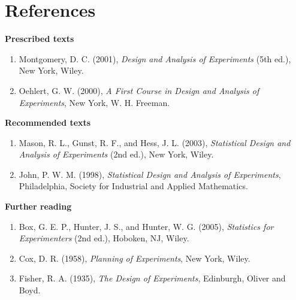 \documentclass[11pt,a4paper]{article}
\numberwithin{equation}{section}
\theoremstyle{definition}
\newcommand{\subhead}[1]{%
  \par\medskip\noindent\textbf{#1}\par\nobreak\smallskip}
\begin{document}
\section*{References}

\subhead{Prescribed texts}
\begin{enumerate}
\item Montgomery, D. C. (2001), \emph{Design and Analysis of Experiments} (5th ed.), New York, Wiley.
\item Oehlert, G. W. (2000), \emph{A First Course in Design and Analysis of Experiments}, New York, W. H. Freeman.
\end{enumerate}

\subhead{Recommended texts}
\begin{enumerate}
\item Mason, R. L., Gunst, R. F., and Hess, J. L. (2003), \emph{Statistical Design and Analysis of Experiments} (2nd ed.), New York, Wiley.
\item John, P. W. M. (1998), \emph{Statistical Design and Analysis of Experiments}, Philadelphia, Society for Industrial and Applied Mathematics.
\end{enumerate}

\subhead{Further reading}
\begin{enumerate}
\item Box, G. E. P., Hunter, J. S., and Hunter, W. G. (2005), \emph{Statistics for Experimenters} (2nd ed.), Hoboken, NJ, Wiley.
\item Cox, D. R. (1958), \emph{Planning of Experiments}, New York, Wiley.
\item Fisher, R. A. (1935), \emph{The Design of Experiments}, Edinburgh, Oliver and Boyd.
\end{enumerate}
\end{document}
